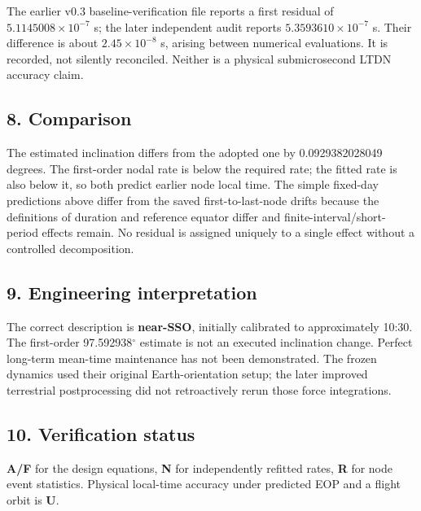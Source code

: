 \documentclass[10pt,a4paper]{article}
\numberwithin{equation}{section}
\begin{document}
\begin{sloppypar}The earlier v0.3 baseline-verification file reports a first residual of \(5.1145008\times10^{-7}\) s; the later independent audit reports \(5.3593610\times10^{-7}\) s. Their difference is about \(2.45\times10^{-8}\) s, arising between numerical evaluations. It is recorded, not silently reconciled. Neither is a physical submicrosecond LTDN accuracy claim.\end{sloppypar}


\subsection*{8. Comparison}
\begin{sloppypar}The estimated inclination differs from the adopted one by 0.0929382028049 degrees. The first-order nodal rate is below the required rate; the fitted rate is also below it, so both predict earlier node local time. The simple fixed-day predictions above differ from the saved first-to-last-node drifts because the definitions of duration and reference equator differ and finite-interval/short-period effects remain. No residual is assigned uniquely to a single effect without a controlled decomposition.\end{sloppypar}


\subsection*{9. Engineering interpretation}
\begin{sloppypar}The correct description is \textbf{near-SSO}, initially calibrated to approximately 10:30. The first-order 97.592938\ensuremath{{}^{\circ}} estimate is not an executed inclination change. Perfect long-term mean-time maintenance has not been demonstrated. The frozen dynamics used their original Earth-orientation setup; the later improved terrestrial postprocessing did not retroactively rerun those force integrations.\end{sloppypar}


\subsection*{10. Verification status}
\begin{sloppypar}\textbf{A/F} for the design equations, \textbf{N} for independently refitted rates, \textbf{R} for node event statistics. Physical local-time accuracy under predicted EOP and a flight orbit is \textbf{U}.\end{sloppypar}
\end{document}
